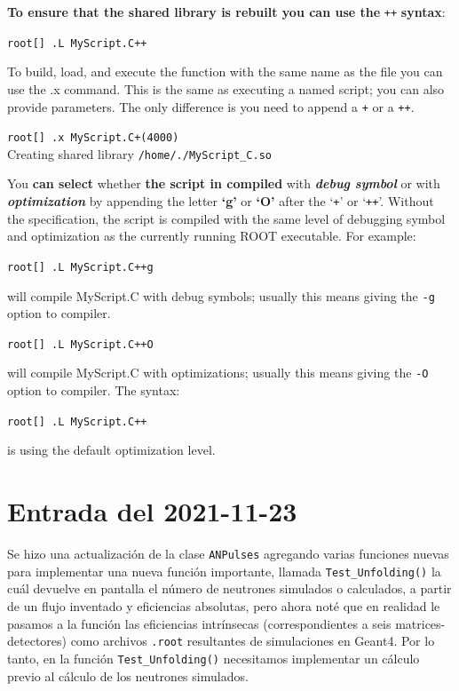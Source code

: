 \documentclass[11pt,letterpaper]{article}
\begin{document}
\begin{displayquote}
\textbf{To ensure that the shared library is rebuilt you can use the} \verb|++| \textbf{syntax}:

\verb|root[] .L MyScript.C++|

To build, load, and execute the function with the same name as the file you can use the .x command. This is the same as executing a named script; you can also provide parameters. The only difference is you need to append a \verb|+| or a \verb|++|.

\verb|root[] .x MyScript.C+(4000)|\\
Creating shared library \verb|/home/./MyScript_C.so|

You \textbf{can select} whether \textbf{the script in compiled} with \emph{\textbf{debug symbol}} or with \emph{\textbf{optimization}} by appending the letter \textbf{‘g’} or \textbf{‘O’} after the ‘\verb|+|’ or ‘\verb|++|’. Without the specification, the script is compiled with the same level of debugging symbol and optimization as the currently running ROOT executable. For example:

\verb|root[] .L MyScript.C++g|

will compile MyScript.C with debug symbols; usually this means giving the \verb|-g| option to compiler.

\verb|root[] .L MyScript.C++O|

will compile MyScript.C with optimizations; usually this means giving the \verb|-O| option to compiler. The syntax:

\verb|root[] .L MyScript.C++|

is using the default optimization level.

\end{displayquote}

\section{Entrada del 2021-11-23}
\label{2021-11-23}

Se hizo una actualización de la clase \verb|ANPulses| agregando varias funciones nuevas para implementar una nueva función importante, llamada \verb|Test_Unfolding()| la cuál devuelve en pantalla el número de neutrones simulados o calculados, a partir de un flujo inventado y eficiencias absolutas, pero ahora noté que en realidad le pasamos a la función las eficiencias intrínsecas (correspondientes a seis matrices-detectores) como archivos \verb|.root| resultantes de simulaciones en Geant4. Por lo tanto, en la función \verb|Test_Unfolding()| necesitamos implementar un cálculo previo al cálculo de los neutrones simulados.
\end{document}

